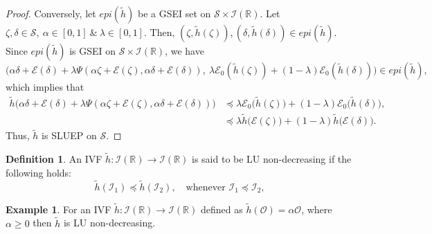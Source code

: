 \documentclass[12pt, reqno]{amsart}
\theoremstyle{definition}
\newtheorem{definition}{Definition}[section]
\newtheorem{example}{Example}[section]
\theoremstyle{remark}
\numberwithin{equation}{section}
\begin{document}
\begin{proof}
       		\vspace{.2cm}
       	\noindent
       	Conversely, let $epi( \tilde{h})$ be a GSEI set on $ {\mathcal{S}}\times  \mathcal{I}(\mathbb{R})$. Let $\mathit{\zeta} ,\mathit{\delta} \in  {\mathcal{S}},~ {\alpha} \in {[0,1]}~\&~ {\lambda}\in {[0,1]} $. Then, $(\mathit{\zeta} , \tilde{h}(\mathit{\zeta} )),(\mathit{\delta} , \tilde{h} (\mathit{\delta} ))\in epi(\tilde{h})$. Since $epi( \tilde{h})$ is GSEI on ${\mathcal{S}}\times \mathcal{I}(\mathbb{R})$, we have
       	$$\big({\alpha}\mathit{\delta} +{\mathcal{E}} (\mathit{\delta} )+ {\lambda} {\Psi}( {\alpha}  \mathit{\zeta} + {\mathcal{E}}( \mathit{\zeta} ), {\alpha}\mathit{\delta} + {\mathcal{E}} (\mathit{\delta} )), ~{\lambda}  {\mathcal{E}}_{0}( \tilde{h}( \mathit{\zeta} ))+(1-{\lambda}) {\mathcal{E}}_{0}( \tilde{h}( \mathit{\delta} ))\big)\in epi( \tilde{h}),$$ which implies that
       	\begin{equation*}
       	    \begin{aligned}
       	         \tilde{h}\big({\alpha}  \mathit{\delta} + {\mathcal{E}}( \mathit{\delta} )+ {\lambda} {\Psi}( {\alpha}  \mathit{\zeta} + {\mathcal{E}}( \mathit{\zeta} ), {\alpha}  \mathit{\delta} + {\mathcal{E}}( \mathit{\delta} ))\big)&\preceq {\lambda}{\mathcal{E}}_{0}\big(\tilde{h}(\mathit{\zeta} )\big)+(1-{\lambda}){\mathcal{E}}_{0}\big( \tilde{h}( \mathit{\delta} )\big),\\
       		&\preceq {\lambda}\tilde{h}\big({\mathcal{E}}( \mathit{\zeta} )\big)+(1-{\lambda})\tilde{h}\big({\mathcal{E}}( \mathit{\delta} )\big).
       	    \end{aligned}
       	\end{equation*}
       Thus, $\tilde{h}$ is SLUEP on $ {\mathcal{S}}$.    
       \end{proof}

       \begin{definition}
    An IVF $\tilde{h} : \mathcal{I}(\mathbb{R})  \to \mathcal{I}(\mathbb{R}) $ is said to be LU non-decreasing if the following holds:
\[
\tilde{h}(\mathcal{I}_1) \preceq \tilde{h}(\mathcal{I}_2), \quad \text{whenever } \mathcal{I}_1\preceq \mathcal{I}_2,
\]
\end{definition}
\begin{example}
    For an IVF $\tilde{h} : \mathcal{ I(\mathbb{R})}  \to \mathcal{ I(\mathbb{R})} $ defined as 
    $\tilde{h}(\mathcal{O})=\alpha\mathcal{O} $, where $\alpha \geq 0$ then $\tilde{h}$ is LU non-decreasing.
\end{example}
\end{document}
